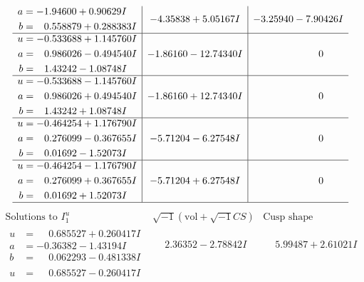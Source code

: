 \documentclass[1p]{elsarticle_modified}
\theoremstyle{definition}
\newcommand{\I}{\sqrt{-1}}
\begin{document}
$$\begin{array}{c|c|c}
\begin{aligned}
a &= -1.94600 + 0.90629 I \\
b &= \phantom{-}0.558879 + 0.288383 I\end{aligned}
 & -4.35838 + 5.05167 I & -3.25940 - 7.90426 I \\ \hline\begin{aligned}
u &= -0.533688 + 1.145760 I \\
a &= \phantom{-}0.986026 - 0.494540 I \\
b &= \phantom{-}1.43242 - 1.08748 I\end{aligned}
 & -1.86160 - 12.74340 I & \phantom{-0.000000 } 0 \\ \hline\begin{aligned}
u &= -0.533688 - 1.145760 I \\
a &= \phantom{-}0.986026 + 0.494540 I \\
b &= \phantom{-}1.43242 + 1.08748 I\end{aligned}
 & -1.86160 + 12.74340 I & \phantom{-0.000000 } 0 \\ \hline\begin{aligned}
u &= -0.464254 + 1.176790 I \\
a &= \phantom{-}0.276099 - 0.367655 I \\
b &= \phantom{-}0.01692 - 1.52073 I\end{aligned}
 & -5.71204 - 6.27548 I & \phantom{-0.000000 } 0 \\ \hline\begin{aligned}
u &= -0.464254 - 1.176790 I \\
a &= \phantom{-}0.276099 + 0.367655 I \\
b &= \phantom{-}0.01692 + 1.52073 I\end{aligned}
 & -5.71204 + 6.27548 I & \phantom{-0.000000 } 0\\
 \hline 
 \end{array}$$\newpage$$\begin{array}{c|c|c}  
\text{Solutions to }I^u_{1}& \I (\text{vol} + \sqrt{-1}CS) & \text{Cusp shape}\\
 \hline 
\begin{aligned}
u &= \phantom{-}0.685527 + 0.260417 I \\
a &= -0.36382 - 1.43194 I \\
b &= \phantom{-}0.062293 - 0.481338 I\end{aligned}
 & \phantom{-}2.36352 - 2.78842 I & \phantom{-}5.99487 + 2.61021 I \\ \hline\begin{aligned}
u &= \phantom{-}0.685527 - 0.260417 I \\

\end{aligned}
\end{array}$$
\end{document}
